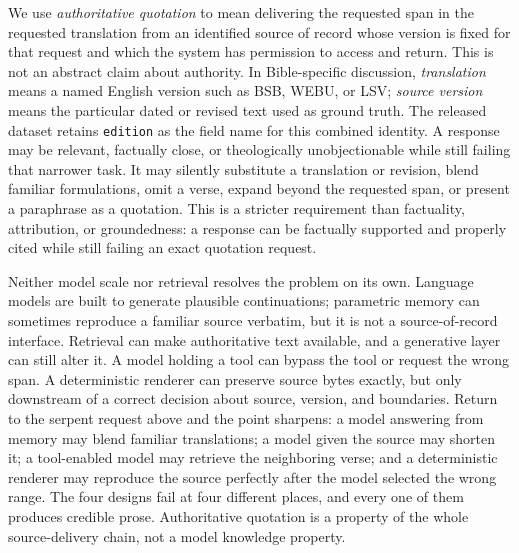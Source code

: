 \documentclass[11pt]{article}
\begin{document}
We use \emph{authoritative quotation} to mean delivering the requested span in
the requested translation from an identified source of record whose version is
fixed for that request and which the system has permission to access and
return. This is not an abstract claim about authority. In Bible-specific
discussion, \emph{translation} means a named English version such as BSB,
WEBU, or LSV; \emph{source version} means the particular dated or revised text
used as ground truth. The released dataset retains \texttt{edition} as the
field name for this combined identity. A response may be relevant, factually close, or
theologically unobjectionable while still failing that narrower task. It may
silently substitute a translation or revision, blend familiar formulations, omit a verse,
expand beyond the requested span, or present a paraphrase as a quotation. This
is a stricter requirement than factuality, attribution, or groundedness: a
response can be factually supported and properly cited while still failing an
exact quotation request.

Neither model scale nor retrieval resolves the problem on its own. Language
models are built to generate plausible continuations; parametric memory can
sometimes reproduce a familiar source verbatim, but it is not a
source-of-record interface. Retrieval can make authoritative text available,
and a generative layer can still alter it. A model holding a tool can bypass
the tool or request the wrong span. A deterministic renderer can preserve
source bytes exactly, but only downstream of a correct decision about source,
version, and boundaries. Return to the serpent request above and the point
sharpens: a model answering from memory may blend familiar translations; a
model given the source may shorten it; a tool-enabled model may retrieve the
neighboring verse; and a deterministic renderer may reproduce the source
perfectly after the model selected the wrong range. The four designs fail at
four different places, and every one of them produces credible prose.
Authoritative quotation is a property of the whole source-delivery chain, not a
model knowledge property.
\end{document}
